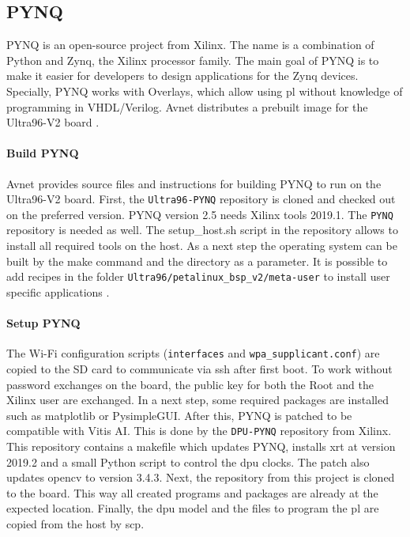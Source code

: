 \subsection{PYNQ}
\label{subsec:embedded_platform:operating_systems:pynq}

PYNQ is an open-source project from Xilinx.
The name is a combination of Python and Zynq, the Xilinx processor family.
The main goal of PYNQ is to make it easier for developers to design applications for the Zynq devices. 
Specially, PYNQ works with Overlays, which allow using \acrlong{pl} without knowledge of programming in VHDL/Verilog.
Avnet distributes a prebuilt image for the Ultra96-V2 board \cite{pynq_intro}.

\paragraph{Build PYNQ}
Avnet provides source files and instructions for building PYNQ to run on the Ultra96-V2 board.
First, the \texttt{Ultra96-PYNQ} repository is cloned and checked out on the preferred version.
PYNQ version 2.5 needs Xilinx tools 2019.1.
The \texttt{PYNQ} repository is needed as well.
The setup\_host.sh script in the repository allows to install all required tools on the host.
As a next step the operating system can be built by the make command and the directory as a parameter.
It is possible to add recipes in the folder \texttt{Ultra96/petalinux\_bsp\_v2/meta-user} to install user specific applications \cite{avnet_pynq_github}. 

\paragraph{Setup PYNQ}
The Wi-Fi configuration scripts (\texttt{interfaces} and \texttt{wpa\_supplicant.conf}) are copied to the SD card to communicate via \acrfull{ssh} after first boot.
To work without password exchanges on the board, the public key for both the Root and the Xilinx user are exchanged.
In a next step, some required packages are installed such as matplotlib or PysimpleGUI.
After this, PYNQ is patched to be compatible with Vitis AI.
This is done by the \texttt{DPU-PYNQ} repository from Xilinx.
This repository contains a makefile which updates PYNQ, installs \acrfull{xrt} at version 2019.2 and a small Python script to control the \acrfull{dpu} clocks.
The patch also updates \acrshort{opencv} to version 3.4.3.
Next, the repository from this project is cloned to the board.
This way all created programs and packages are already at the expected location.
Finally, the \acrshort{dpu} model and the files to program the \acrfull{pl} are copied from the host by \acrfull{scp}.

